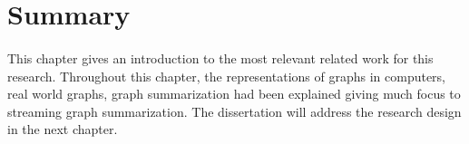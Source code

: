 \section{Summary}

\paragraph{}
This chapter gives an introduction to the most relevant related work for this research. Throughout this chapter, the representations of graphs in computers, real world graphs, graph summarization had been explained giving much focus to streaming graph summarization. The dissertation will address the research design in the next chapter.